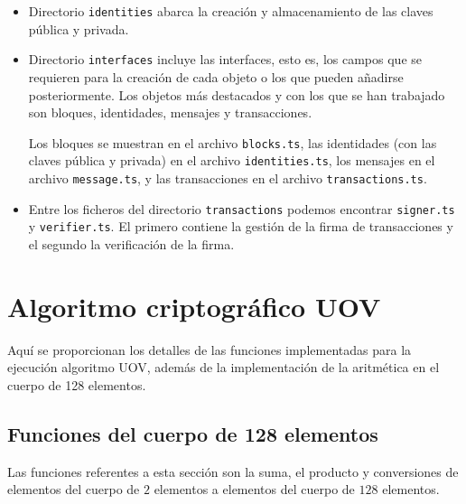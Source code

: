 \begin{itemize}
	\begin{lstlisting}[language=Python,caption=Estructura archivo data.json, label=cod:data-json]
		{
			"id":
			"pub_schnorr":
			"priv_schnorr":
			"priv_alpha_UOV": 
			"priv_beta_UOV": 
			"pub_alpha_UOV": 
			"pub_beta_UOV": 
		}
	\end{lstlisting}
	
	\begin{lstlisting}[language=Python,caption=Estructura archivo signature.json, label=cod:sign-json]
		{
			"hex":
			"vector":
		}
	\end{lstlisting}
	
	\item Directorio \texttt{identities} abarca la creación y almacenamiento de las claves pública y privada.
	\item Directorio \texttt{interfaces} incluye las interfaces, esto es, los campos que se requieren para la creación de cada objeto o los que pueden añadirse posteriormente. Los objetos más destacados y con los que se han trabajado son bloques, identidades, mensajes y transacciones.
	
	Los bloques se muestran en el archivo \texttt{blocks.ts}, las identidades (con las claves pública y privada) en el archivo \texttt{identities.ts}, los mensajes en el archivo \texttt{message.ts}, y las transacciones en el archivo \texttt{transactions.ts}.
	\item Entre los ficheros del directorio \texttt{transactions} podemos encontrar \texttt{signer.ts} y \texttt{verifier.ts}. El primero contiene la gestión de la firma de transacciones y el segundo la verificación de la firma.
\end{itemize}


\newpage

\section{Algoritmo criptográfico UOV}\label{sec:impl:alg}
Aquí se proporcionan los detalles de las funciones implementadas para la ejecución algoritmo UOV, además de la implementación de la aritmética en el cuerpo de 128 elementos.\\

\subsection{Funciones del cuerpo de 128 elementos}
Las funciones referentes a esta sección son la suma, el producto y conversiones de elementos del cuerpo de $2$ elementos a elementos del cuerpo de $128$ elementos.\\


